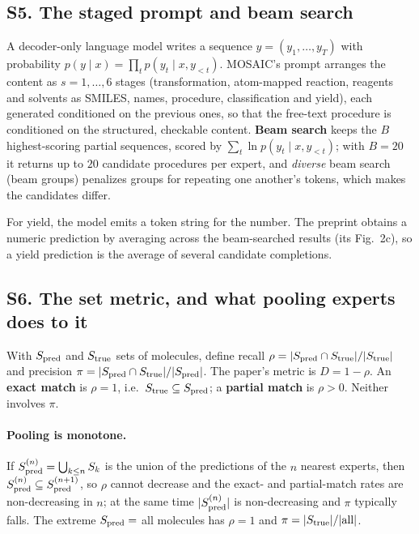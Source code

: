\documentclass[11pt]{article}
\begin{document}
\label{sec:S5}
\subsection*{S5. The staged prompt and beam search}
A decoder-only language model writes a sequence $y=(y_1,\dots,y_T)$ with probability $p(y\mid x)=\prod_tp(y_t\mid x,y_{<t})$. MOSAIC's prompt arranges the content as $s=1,\dots,6$ stages (transformation, atom-mapped reaction, reagents and solvents as SMILES, names, procedure, classification and yield), each generated conditioned on the previous ones, so that the free-text procedure is conditioned on the structured, checkable content. \textbf{Beam search} keeps the $B$ highest-scoring partial sequences, scored by $\sum_t\ln p(y_t\mid x,y_{<t})$; with $B=20$ it returns up to $20$ candidate procedures per expert, and \emph{diverse} beam search (beam groups) penalizes groups for repeating one another's tokens, which makes the candidates differ.

For yield, the model emits a token string for the number. The preprint obtains a numeric prediction by averaging across the beam-searched results (its Fig.~2c), so a yield prediction is the average of several candidate completions.

\label{sec:S6}
\subsection*{S6. The set metric, and what pooling experts does to it}
With $S_{\rm pred}$ and $S_{\rm true}$ sets of molecules, define recall $\rho=|S_{\rm pred}\cap S_{\rm true}|/|S_{\rm true}|$ and precision $\pi=|S_{\rm pred}\cap S_{\rm true}|/|S_{\rm pred}|$. The paper's metric is $D=1-\rho$. An \textbf{exact match} is $\rho=1$, i.e.\ $S_{\rm true}\subseteq S_{\rm pred}$; a \textbf{partial match} is $\rho>0$. Neither involves $\pi$.

\paragraph{Pooling is monotone.} If $S_{\rm pred}^{(n)}=\bigcup_{k\le n}S_k$ is the union of the predictions of the $n$ nearest experts, then $S_{\rm pred}^{(n)}\subseteq S_{\rm pred}^{(n+1)}$, so $\rho$ cannot decrease and the exact- and partial-match rates are non-decreasing in $n$; at the same time $|S_{\rm pred}^{(n)}|$ is non-decreasing and $\pi$ typically falls. The extreme $S_{\rm pred}=$ all molecules has $\rho=1$ and $\pi=|S_{\rm true}|/|\text{all}|$.
\end{document}
